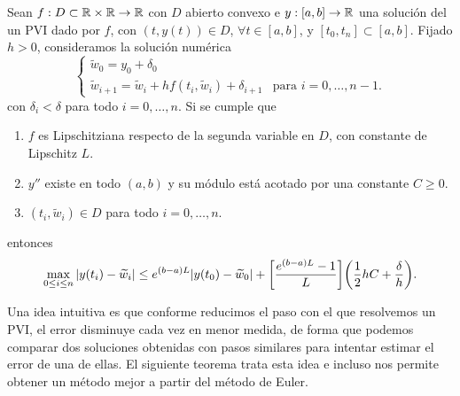 \begin{theorem}
    \renewcommand{\tw}{\widetilde{w}}

    Sean $f : D \subset \mathbb{R} \times \mathbb{R} \to \mathbb{R}$ con $D$ abierto convexo
    e $y : [a, b] \to \mathbb{R}$ una solución del un PVI dado por $f$,
    con $(t, y(t)) \in D$, $\forall t \in [a, b]$,
    y $[t_0, t_n] \subset [a, b]$.
    Fijado $h > 0$, consideramos la solución numérica
    \begin{equation}
    \begin{cases}
        \tw_0 = y_0 + \delta_0 \\
        \tw_{i+1} = \tw_i + hf(t_i, \tw_i) + \delta_{i+1}
            & \text{para $i = 0,\ldots,n-1$.}
    \end{cases}
    \end{equation}
    con $\delta_i < \delta$ para todo $i = 0,\ldots,n$.
    Si se cumple que
    \begin{enumerate}[label=(\alph*)]
        \item $f$ es Lipschitziana respecto de la segunda variable en $D$,
        con constante de Lipschitz $L$.
        \item $y''$ existe en todo $(a, b)$ y
        su módulo está acotado por una constante $C \ge 0$.
        \item $(t_i, \tw_i) \in D$ para todo $i = 0,\dots,n$.
    \end{enumerate}
    entonces
    \begin{equation*}
        \max_{0 \le i \le n} \abs{y(t_i) - \tw_i} \le
        \nume^{(b-a)L}\abs{y(t_0)-\tw_0} + \qty[\frac{\nume^{(b-a)L}-1}{L}]\qty(
            \frac{1}{2}hC + \frac{\delta}{h}
        ).
    \end{equation*}
\end{theorem}

Una idea intuitiva es que
conforme reducimos el paso con el que resolvemos un PVI,
el error disminuye cada vez en menor medida,
de forma que podemos comparar dos soluciones obtenidas con pasos similares
para intentar estimar el error de una de ellas.
El siguiente teorema trata esta idea e incluso
nos permite obtener un método mejor a partir del método de Euler.

